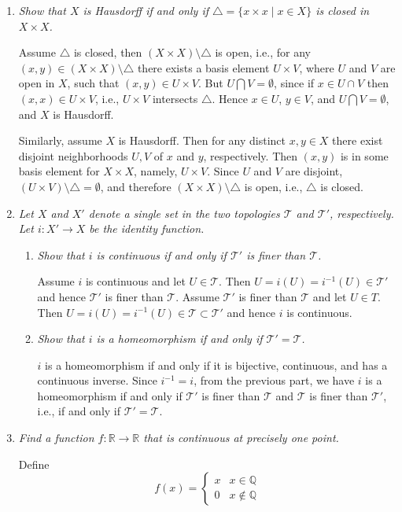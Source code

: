 \documentclass[11pt]{article}
\newcommand{\Q}{\mathbb{Q}}
\newcommand{\R}{\mathbb{R}}
\newcommand{\T}{\mathcal{T}}
\begin{document}
\begin{enumerate}
\item \emph{Show that $X$ is Hausdorff if and only if $\triangle = \{x \times x \mid x \in X\}$ is closed in $X \times X$.}

Assume $\triangle$ is closed, then $(X \times X) \setminus \triangle$ is open, i.e., for any $(x,y) \in (X \times X) \setminus \triangle$ there exists a basis element $U \times V$, where $U$ and $V$ are open in $X$, such that $(x,y) \in U \times V$.  But $U \bigcap V = \emptyset$, since if $x \in U \cap V$ then $(x,x) \in U \times V$, i.e., $U \times V$ intersects $\triangle$.  Hence $x \in U$, $y \in V$, and $U \bigcap V = \emptyset$, and $X$ is Hausdorff.

Similarly, assume $X$ is Hausdorff.  Then for any distinct $x,y \in X$ there exist disjoint neighborhoods $U,V$ of $x$ and $y$, respectively.  Then $(x,y)$ is in some basis element for $X \times X$, namely, $U \times V$.  Since $U$ and $V$ are disjoint, $(U \times V) \setminus \triangle = \emptyset$, and therefore $(X \times X)\setminus \triangle$ is open, i.e., $\triangle$ is closed.

\item \emph{Let $X$ and $X'$ denote a single set in the two topologies $\T$ and $\T'$, respectively.  Let $i: X' \rightarrow X$ be the identity function.}
\begin{enumerate}
\item \emph{Show that $i$ is continuous if and only if $\T'$ is finer than $\T$.}

Assume $i$ is continuous and let $U \in \T$.  Then $U = i(U) = i^{-1}(U) \in \T'$ and hence $\T'$ is finer than $\T$.  Assume $\T'$ is finer than $\T$ and let $U \in T$.  Then $U = i(U) = i^{-1}(U) \in \T \subset \T'$ and hence $i$ is continuous.

\item \emph{Show that $i$ is a homeomorphism if and only if $\T' = \T$.}

$i$ is a homeomorphism if and only if it is bijective, continuous, and has a continuous inverse.  Since $i^{-1} = i$, from the previous part, we have $i$ is a homeomorphism if and only if $\T'$ is finer than $\T$ and $\T$ is finer than $\T'$, i.e., if and only if $\T' = \T$.

\end{enumerate}

\item \emph{Find a function $f: \R \rightarrow \R$ that is continuous at precisely one point.}

Define $$f(x) = \begin{cases} x & x \in \Q \\ 0 & x \notin \Q \end{cases}$$


\end{enumerate}
\end{document}
